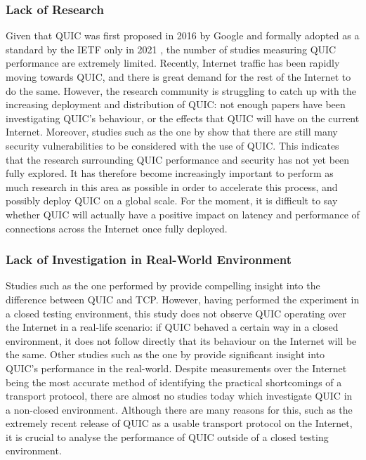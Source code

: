 \documentclass{l4proj}
\begin{document}
\subsubsection{Lack of Research} Given that QUIC was first proposed in 2016 by Google \citep{Lang2017} and formally adopted as a standard by the IETF only in 2021 \citep{Iyen2021}, the number of studies measuring QUIC performance are extremely limited. Recently, Internet traffic has been rapidly moving towards QUIC, and there is great demand for the rest of the Internet to do the same. However, the research community is struggling to catch up with the increasing deployment and distribution of QUIC: not enough papers have been investigating QUIC's behaviour, or the effects that QUIC will have on the current Internet. Moreover, studies such as the one by \citet{Soni2021} show that there are still many security vulnerabilities to be considered with the use of QUIC. This indicates that the research surrounding QUIC performance and security has not yet been fully explored. It has therefore become increasingly important to perform as much research in this area as possible in order to accelerate this process, and possibly deploy QUIC on a global scale. For the moment, it is difficult to say whether QUIC will actually have a positive impact on latency and performance of connections across the Internet once fully deployed.

\subsubsection{Lack of Investigation in Real-World Environment} Studies such as the one performed by \citet{Wang2018} provide compelling insight into the difference between QUIC and TCP. However, having performed the experiment in a closed testing environment, this study does not observe QUIC operating over the Internet in a real-life scenario: if QUIC behaved a certain way in a closed environment, it does not follow directly that its behaviour on the Internet will be the same. Other studies such as the one by \citet{Nepomu2018} provide significant insight into QUIC's performance in the real-world. Despite measurements over the Internet being the most accurate method of identifying the practical shortcomings of a transport protocol, there are almost no studies today which investigate QUIC in a non-closed environment. Although there are many reasons for this, such as the extremely recent release of QUIC as a usable transport protocol on the Internet, it is crucial to analyse the performance of QUIC outside of a closed testing environment.
\end{document}
